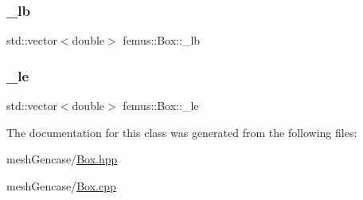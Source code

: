 \subsubsection{\texorpdfstring{\+\_\+lb}{\_lb}}
{\footnotesize\ttfamily std\+::vector$<$double$>$ femus\+::\+Box\+::\+\_\+lb}

\mbox{\label{classfemus_1_1_box_a65fed8de18221ad064d17a440e3f3b04}} 
\subsubsection{\texorpdfstring{\+\_\+le}{\_le}}
{\footnotesize\ttfamily std\+::vector$<$double$>$ femus\+::\+Box\+::\+\_\+le}



The documentation for this class was generated from the following files\+:\begin{DoxyCompactItemize}
\item 
mesh\+Gencase/\mbox{\hyperlink{_box_8hpp}{Box.\+hpp}}\item 
mesh\+Gencase/\mbox{\hyperlink{_box_8cpp}{Box.\+cpp}}\end{DoxyCompactItemize}
